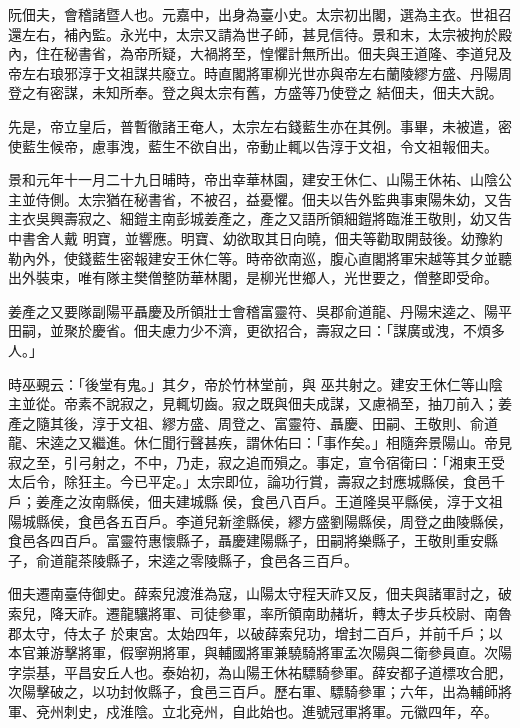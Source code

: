 \begin{pinyinscope}
 阮佃夫，會稽諸暨人也。元嘉中，出身為臺小史。太宗初出閣，選為主衣。世祖召還左右，補內監。永光中，太宗又請為世子師，甚見信待。景和末，太宗被拘於殿內，住在秘書省，為帝所疑，大禍將至，惶懼計無所出。佃夫與王道隆、李道兒及帝左右琅邪淳于文祖謀共廢立。時直閣將軍柳光世亦與帝左右蘭陵繆方盛、丹陽周登之有密謀，未知所奉。登之與太宗有舊，方盛等乃使登之
 結佃夫，佃夫大說。



 先是，帝立皇后，普暫徹諸王奄人，太宗左右錢藍生亦在其例。事畢，未被遣，密使藍生候帝，慮事洩，藍生不欲自出，帝動止輒以告淳于文祖，令文祖報佃夫。



 景和元年十一月二十九日晡時，帝出幸華林園，建安王休仁、山陽王休祐、山陰公主並侍側。太宗猶在秘書省，不被召，益憂懼。佃夫以告外監典事東陽朱幼，又告主衣吳興壽寂之、細鎧主南彭城姜產之，產之又語所領細鎧將臨淮王敬則，幼又告中書舍人戴
 明寶，並響應。明寶、幼欲取其日向曉，佃夫等勸取開鼓後。幼豫約勒內外，使錢藍生密報建安王休仁等。時帝欲南巡，腹心直閣將軍宋越等其夕並聽出外裝束，唯有隊主樊僧整防華林閣，是柳光世鄉人，光世要之，僧整即受命。



 姜產之又要隊副陽平聶慶及所領壯士會稽富靈符、吳郡俞道龍、丹陽宋逵之、陽平田嗣，並聚於慶省。佃夫慮力少不濟，更欲招合，壽寂之曰：「謀廣或洩，不煩多人。」



 時巫覡云：「後堂有鬼。」其夕，帝於竹林堂前，與
 巫共射之。建安王休仁等山陰主並從。帝素不說寂之，見輒切齒。寂之既與佃夫成謀，又慮禍至，抽刀前入；姜產之隨其後，淳于文祖、繆方盛、周登之、富靈符、聶慶、田嗣、王敬則、俞道龍、宋逵之又繼進。休仁聞行聲甚疾，謂休佑曰：「事作矣。」相隨奔景陽山。帝見寂之至，引弓射之，不中，乃走，寂之追而殞之。事定，宣令宿衛曰：「湘東王受太后令，除狂主。今已平定。」太宗即位，論功行賞，壽寂之封應城縣侯，食邑千戶；姜產之汝南縣侯，佃夫建城縣
 侯，食邑八百戶。王道隆吳平縣侯，淳于文祖陽城縣侯，食邑各五百戶。李道兒新塗縣侯，繆方盛劉陽縣侯，周登之曲陵縣侯，食邑各四百戶。富靈符惠懷縣子，聶慶建陽縣子，田嗣將樂縣子，王敬則重安縣子，俞道龍茶陵縣子，宋逵之零陵縣子，食邑各三百戶。



 佃夫遷南臺侍御史。薛索兒渡淮為寇，山陽太守程天祚又反，佃夫與諸軍討之，破索兒，降天祚。遷龍驤將軍、司徒參軍，率所領南助赭圻，轉太子步兵校尉、南魯郡太守，侍太子
 於東宮。太始四年，以破薛索兒功，增封二百戶，并前千戶；以本官兼游擊將軍，假寧朔將軍，與輔國將軍兼驍騎將軍孟次陽與二衛參員直。次陽字崇基，平昌安丘人也。泰始初，為山陽王休祐驃騎參軍。薛安都子道標攻合肥，次陽擊破之，以功封攸縣子，食邑三百戶。歷右軍、驃騎參軍；六年，出為輔師將軍、兗州刺史，戍淮陰。立北兗州，自此始也。進號冠軍將軍。元徽四年，卒。




\end{pinyinscope}
